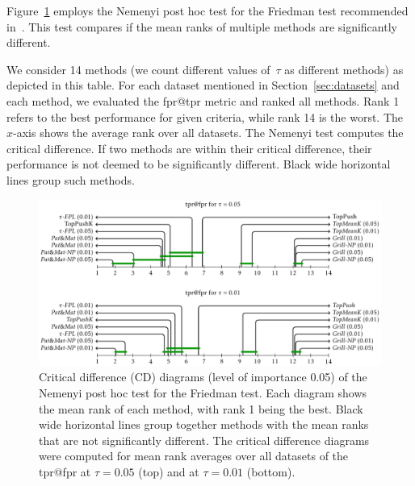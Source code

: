 Figure~\ref{fig: critical diagrams} employs the Nemenyi post hoc test for the Friedman test recommended in~\cite{demvsar2006statistical}. This test compares if the mean ranks of multiple methods are significantly different.

We consider 14 methods (we count different values of~$\tau$ as different methods) as depicted in this table. For each dataset mentioned in Section~\ref{sec:datasets} and each method, we evaluated the fpr@tpr metric and ranked all methods. Rank 1 refers to the best performance for given criteria, while rank 14 is the worst. The~$x$-axis shows the average rank over all datasets. The Nemenyi test computes the critical difference. If two methods are within their critical difference, their performance is not deemed to be significantly different. Black wide horizontal lines group such methods.

\begin{figure}[!ht]
  \centering
  \includegraphics[width = \linewidth]{images/crit_diag.pdf}
  \caption{Critical difference (CD) diagrams (level of importance 0.05) of the Nemenyi post hoc test for the Friedman test. Each diagram shows the mean rank of each method, with rank 1 being the best. Black wide horizontal lines group together methods with the mean ranks that are not significantly different. The critical difference diagrams were computed for mean rank averages over all datasets of the tpr@fpr at $\tau=0.05$ (top) and at $\tau=0.01$ (bottom).}
  \label{fig: critical diagrams}
\end{figure}

